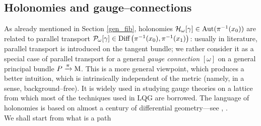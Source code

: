 \subsection{Holonomies and gauge--connections}\label{holonomies}
As already mentioned in Section \ref{gen_fib}, holonomies $\mathcal{H}_\omega[\gamma]\in\text{\normalfont Aut}(\pi^{-1}(x_0))$ are related to parallel transport $\mathcal{P}_\omega[\gamma]\in\text{\normalfont Diff}\left(\pi^{-1}(x_0),\pi^{-1}(x_1)\right)$: usually in literature, parallel transport is introduced on the tangent bundle; we rather consider it as a special case of parallel transport for a general \emph{gauge connection} $[\omega]$ on a general principal bundle $P\xrightarrow{\pi}\text{\normalfont M}$. This is a more general viewpoint, which produces a better intuition, which is intrinsically independent of the metric (namely, in a sense, background--free). It is widely used in studying gauge theories on a lattice from which most of the techniques used in LQG are borrowed. The language of holonomies is based on almost a century of differential geometry---see \cite{kobayashi1}, \cite{kobayashi2}.\\ %

We shall start from what is a path

